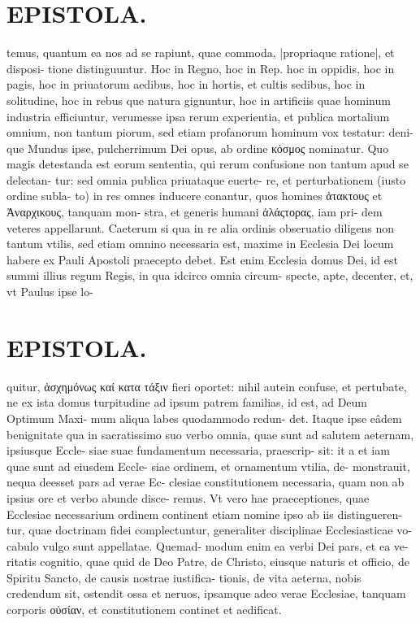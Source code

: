 \documentclass{article}
\begin{document}
\begin{pages}
\section*{EPISTOLA. }temus, quantum ea nos ad se rapiunt, quae commoda, |propriaque ratione|, et disposi- tione distinguuntur. Hoc in Regno, hoc in Rep. hoc in oppidis, hoc in pagis, hoc in priuatorum aedibus, hoc in hortis, et cultis sedibus, hoc in solitudine, hoc in rebus que natura gignuntur, hoc in artificiis quae hominum industria efficiuntur, verumesse ipsa rerum experientia, et publica mortalium omnium, non tantum piorum, sed etiam profanorum hominum vox testatur: deni- que Mundus ipse, pulcherrimum Dei opus, ab ordine κόσμος nominatur. Quo magis detestanda est eorum sententia, qui rerum confusione non tantum apud se delectan- tur: sed omnia publica priuataque euerte- re, et perturbationem (iusto ordine subla- to) in res omnes inducere conantur, quos homines ἀτακτους et Ἀναρχικους, tanquam mon- stra, et generis humani ἀλάςτορας, iam pri- dem veteres appellarunt. Caeterum si qua in re alia ordinis obseruatio diligens non tantum vtilis, sed etiam omnino necessaria est, maxime in Ecclesia Dei locum habere ex Pauli Apostoli praecepto debet. Est enim Ecclesia domus Dei, id est summi illius regum Regis, in qua idcirco omnia circum- specte, apte, decenter, et, vt Paulus ipse lo- 
\section*{EPISTOLA. }quitur, ἀσχημόνως καί κατα τάξιν fieri oportet: nihil autein confuse, et pertubate, ne ex ista domus turpitudine ad ipsum patrem familias, id est, ad Deum Optimum Maxi- mum aliqua labes quodammodo redun- det. Itaque ipse eâdem benignitate qua in sacratissimo suo verbo omnia, quae sunt ad salutem aeternam, ipsiusque Eccle- siae suae fundamentum necessaria, praescrip- sit: it a et iam quae sunt ad eiusdem Eccle- siae ordinem, et ornamentum vtilia, de- monstrauit, nequa deesset pars ad verae Ec- clesiae constitutionem necessaria, quam non ab ipsius ore et verbo abunde disce- remus. Vt vero hae praeceptiones, quae Ecclesiae necessarium ordinem continent etiam nomine ipso ab iis distingueren- tur, quae doctrinam fidei complectuntur, generaliter disciplinae Ecclesiasticae vo- cabulo vulgo sunt appellatae. Quemad- modum enim ea verbi Dei pars, et ea ve- ritatis cognitio, quae quid de Deo Patre, de Christo, eiusque naturis et officio, de Spiritu Sancto, de causis nostrae iustifica- tionis, de vita aeterna, nobis credendum sit, ostendit ossa et neruos, ipsamque adeo verae Ecclesiae, tanquam corporis οὐσίαν, et constitutionem continet et aedificat. 

\end{pages}
\end{document}

